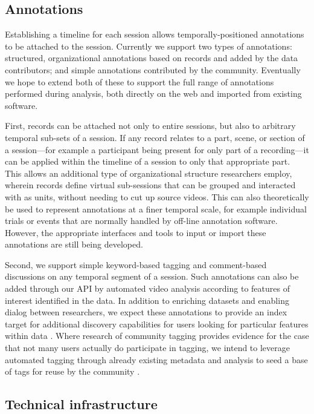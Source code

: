 \documentclass{sig-alternate}
\begin{document}
\subsection{Annotations}

Establishing a timeline for each session allows temporally-positioned annotations to be attached to the session.
Currently we support two types of annotations: structured, organizational annotations based on records and added by the data contributors; and simple annotations contributed by the community.
Eventually we hope to extend both of these to support the full range of annotations performed during analysis, both directly on the web and imported from existing software.

First, records can be attached not only to entire sessions, but also to arbitrary temporal sub-sets of a session.
If any record relates to a part, scene, or section of a session---for example a participant being present for only part of a recording---it can be applied within the timeline of a session to only that appropriate part.
This allows an additional type of organizational structure researchers employ, wherein records define virtual sub-sessions that can be grouped and interacted with as units, without needing to cut up source videos.
This can also theoretically be used to represent annotations at a finer temporal scale, for example individual trials or events that are normally handled by off-line annotation software.
However, the appropriate interfaces and tools to input or import these annotations are still being developed.

Second, we support simple keyword-based tagging and comment-based discussions on any temporal segment of a session.
Such annotations can also be added through our API by automated video analysis according to features of interest identified in the data.
In addition to enriching datasets and enabling dialog between researchers, we expect these annotations to provide an index target for additional discovery capabilities for users looking for particular features within data \cite{Lanagan_Smeaton_2012}. Where research of community tagging provides evidence for the case that not many users actually do participate in tagging, we intend to leverage automated tagging through already existing metadata and analysis to seed a base of tags for reuse by the community \cite{Yang_Lu_Giles_2011, Farooq_etal_2007}.

\subsection{Technical infrastructure}
\end{document}
